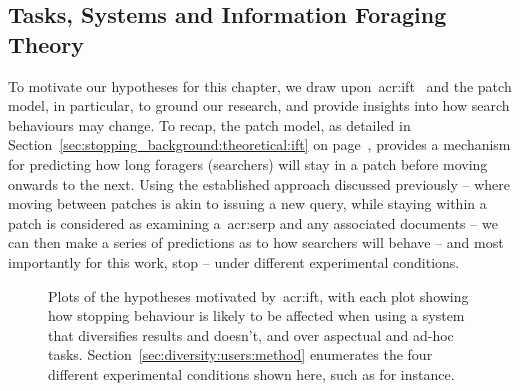 \subsection{Tasks, Systems and Information Foraging Theory}\label{sec:diversity:background:tasks}
To motivate our hypotheses for this chapter, we draw upon~\gls{acr:ift}~\citep{pirolli1999ift} and the patch model, in particular, to ground our research, and provide insights into how search behaviours may change. To recap, the patch model, as detailed in Section~\ref{sec:stopping_background:theoretical:ift} on page~\pageref{sec:stopping_background:theoretical:ift}, provides a mechanism for predicting how long foragers (searchers) will stay in a patch before moving onwards to the next. Using the established approach discussed previously -- where moving between patches is akin to issuing a new query, while staying within a patch is considered as examining a~\gls{acr:serp} and any associated documents -- we can then make a series of predictions as to how searchers will behave -- and most importantly for this work, stop -- under different experimental conditions.

\begin{figure}[t!]
    \centering
    \caption[\gls{acr:ift} and diversification: hypothesis plots]{Plots of the hypotheses motivated by~\gls{acr:ift}, with each plot showing how stopping behaviour is likely to be affected when using a system that  diversifies results and  doesn't, and over  aspectual and  ad-hoc tasks. Section~\ref{sec:diversity:users:method} enumerates the four different experimental conditions shown here, such as  for instance.}
    \label{fig:ift_theory}
\end{figure}

